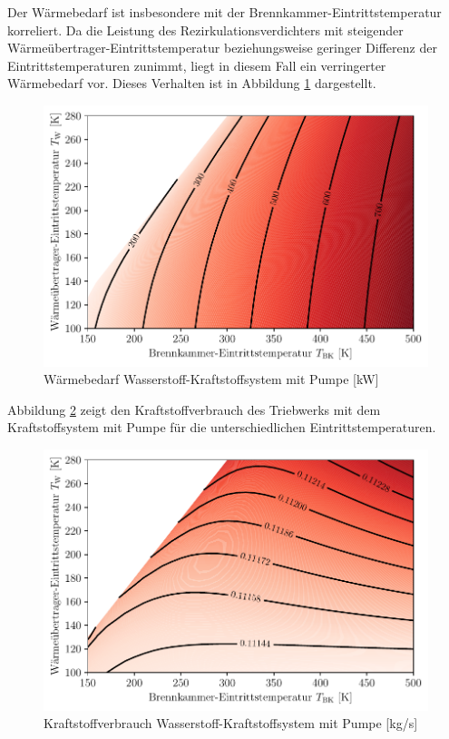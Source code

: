 Der Wärmebedarf ist insbesondere mit der Brennkammer-Eintrittstemperatur korreliert. Da die Leistung des Rezirkulationsverdichters mit steigender Wärmeübertrager-Eintrittstemperatur beziehungsweise geringer Differenz der Eintrittstemperaturen zunimmt, liegt in diesem Fall ein verringerter Wärmebedarf vor. Dieses Verhalten ist in Abbildung \ref{fig:pumpheat} dargestellt.

\begin{figure}[ht]
\centering
\includegraphics[width=0.9\linewidth]{4_Abbildungen/2_Hauptteil/Ergebnisse/Pumpeheatcontour.pdf}
  \caption{Wärmebedarf Wasserstoff-Kraftstoffsystem mit Pumpe [kW]}
  \label{fig:pumpheat}
\end{figure}
\FloatBarrier

Abbildung \ref{fig:pumpfuel} zeigt den Kraftstoffverbrauch des Triebwerks mit dem Kraftstoffsystem mit Pumpe für die unterschiedlichen Eintrittstemperaturen.

\begin{figure}[ht]
\centering
\includegraphics[width=0.9\linewidth]{4_Abbildungen/2_Hauptteil/Ergebnisse/Pumpemassflowcontour.pdf}
  \caption{Kraftstoffverbrauch Wasserstoff-Kraftstoffsystem mit Pumpe [kg/s]}
  \label{fig:pumpfuel}
\end{figure}
\FloatBarrier

